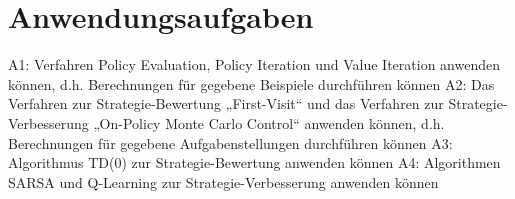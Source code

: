 \documentclass[10pt]{scrartcl}
\begin{document}
\section{Anwendungsaufgaben}
A1: Verfahren Policy Evaluation, Policy Iteration und Value Iteration anwenden können,
d.h. Berechnungen für gegebene Beispiele durchführen können
A2: Das Verfahren zur Strategie-Bewertung „First-Visit“ und das Verfahren zur Strategie-
Verbesserung „On-Policy Monte Carlo Control“ anwenden können, d.h. Berechnungen für
gegebene Aufgabenstellungen durchführen können
A3: Algorithmus TD(0) zur Strategie-Bewertung anwenden können
A4: Algorithmen SARSA und Q-Learning zur Strategie-Verbesserung anwenden können
\end{document}

